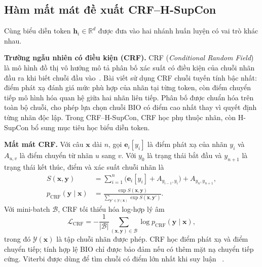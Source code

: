 \documentclass[conference,a4paper]{IEEEtran}
\begin{document}
\subsection{Hàm mất mát đề xuất CRF--H-SupCon}\label{subsec:loss}

Cùng biểu diễn token $\mathbf h_i\in\mathbb R^d$ được đưa vào hai nhánh
huấn luyện có vai trò khác nhau.

\noindent\textbf{Trường ngẫu nhiên có điều kiện (CRF).} CRF
(\textit{Conditional Random Field}) là mô hình đồ thị vô hướng mô tả
phân bố xác suất có điều kiện của chuỗi nhãn đầu ra khi biết chuỗi đầu
vào~\cite{lafferty2001crf}. Bài viết sử dụng CRF chuỗi tuyến tính bậc
nhất: điểm phát xạ đánh giá mức phù hợp của nhãn tại từng token, còn
điểm chuyển tiếp mô hình hóa quan hệ giữa hai nhãn liên tiếp. Phân bố
được chuẩn hóa trên toàn bộ chuỗi, cho phép lựa chọn chuỗi BIO có điểm
cao nhất thay vì quyết định từng nhãn độc lập. Trong CRF--H-SupCon,
CRF học phụ thuộc nhãn, còn H-SupCon bổ sung mục tiêu học biểu diễn token.

\noindent\textbf{Mất mát CRF.} Với câu $\mathbf x$ dài $n$, gọi
$\mathbf e_i[y_i]$ là điểm phát xạ của nhãn $y_i$ và $A_{u,v}$ là điểm
chuyển từ nhãn $u$ sang $v$. Với $y_0$ là trạng thái bắt đầu và
$y_{n+1}$ là trạng thái kết thúc, điểm và xác suất chuỗi nhãn là
\begin{equation}
\begin{aligned}
S(\mathbf x,\mathbf y)
 &=\sum_{i=1}^{n}\bigl(\mathbf e_i[y_i]+A_{y_{i-1},y_i}\bigr)
 +A_{y_n,y_{n+1}},\\
p_{\mathrm{CRF}}(\mathbf y\mid\mathbf x)
 &=\frac{\exp S(\mathbf x,\mathbf y)}
 {\sum_{\mathbf y'\in\mathcal Y(\mathbf x)}\exp S(\mathbf x,\mathbf y')}.
\end{aligned}
\label{eq:crf-probability}
\end{equation}
Với mini-batch $\mathcal B$, CRF tối thiểu hóa log-hợp lý âm
\begin{equation}
\mathcal L_{\mathrm{CRF}}
=-\frac{1}{|\mathcal B|}\sum_{(\mathbf x,\mathbf y)\in\mathcal B}
\log p_{\mathrm{CRF}}(\mathbf y\mid\mathbf x),
\label{eq:crf-loss}
\end{equation}
trong đó $\mathcal Y(\mathbf x)$ là tập chuỗi nhãn được phép. CRF học
điểm phát xạ và điểm chuyển tiếp; tính hợp lệ BIO chỉ được bảo đảm nếu
có thêm mặt nạ chuyển tiếp cứng.
Viterbi được dùng để tìm chuỗi có điểm lớn nhất khi suy luận
~\cite{lafferty2001crf}.
\end{document}
